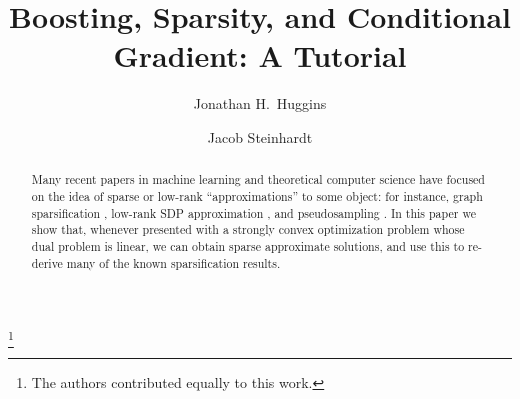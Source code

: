\documentclass[reqno,oneside,a4paper]{amsart}
\begin{document}
 

\title{Boosting, Sparsity, and Conditional Gradient: A Tutorial}
	   
\thanks{The authors contributed equally to this work.}

\author[J.~H.~Huggins]{Jonathan H.~Huggins}
\address{Massachusetts Institute of Technology}

\author[J.~Steinhardt]{Jacob Steinhardt}
\address{Stanford University}


\begin{abstract} 
Many recent papers in machine learning and theoretical computer science have 
focused on the idea of sparse or low-rank ``approximations'' to some object: 
for instance, graph sparsification \cite{?}, low-rank SDP approximation \cite{?}, 
and pseudosampling \cite{?}. In this paper we show that, whenever presented with 
a strongly convex optimization problem whose dual problem is linear, we can obtain 
sparse approximate solutions, and use this to re-derive many of the known 
sparsification results.
\end{abstract} 

\maketitle










\end{document}
